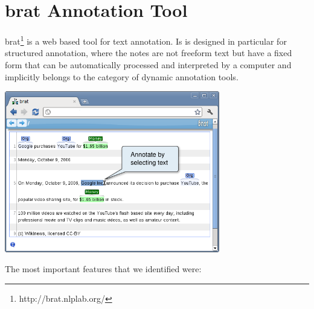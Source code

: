 \documentclass[11pt]{bluenote}
\begin{document}

\section{brat Annotation Tool} %
brat\footnote{http://brat.nlplab.org/} is a web based tool for text annotation. Is is designed in particular for structured annotation, where the notes are not freeform text but have a fixed form that can 
be automatically processed and interpreted by a computer and implicitly belongs to the category of dynamic annotation tools.
\begin{center}
 \includegraphics[width=3.7in]{brat.png}
\end{center}
The most important features that we identified were:
\end{document}
